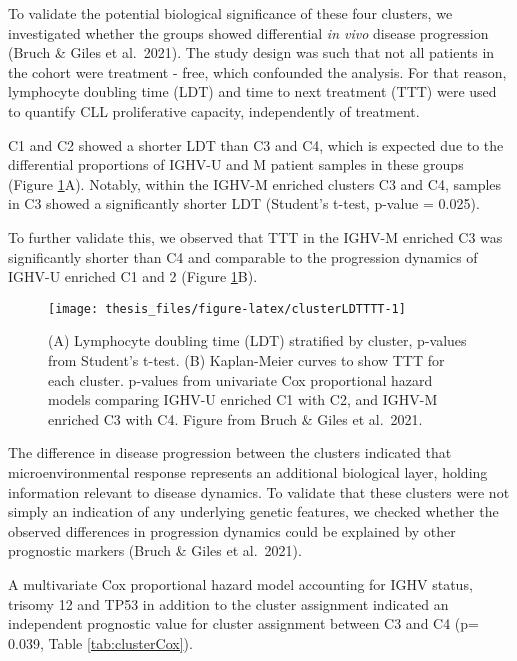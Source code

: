 \documentclass[11pt, a4paper, twosided]{book}
\begin{document}
To validate the potential biological significance of these four clusters, we investigated whether the groups showed differential \emph{in vivo} disease progression (Bruch \& Giles et al.~2021). The study design was such that not all patients in the cohort were treatment - free, which confounded the analysis. For that reason, lymphocyte doubling time (LDT) and time to next treatment (TTT) were used to quantify CLL proliferative capacity, independently of treatment.

C1 and C2 showed a shorter LDT than C3 and C4, which is expected due to the differential proportions of IGHV-U and M patient samples in these groups (Figure \ref{fig:clusterLDTTTT}A). Notably, within the IGHV-M enriched clusters C3 and C4, samples in C3 showed a significantly shorter LDT (Student's t-test, p-value = 0.025).

To further validate this, we observed that TTT in the IGHV-M enriched C3 was significantly shorter than C4 and comparable to the progression dynamics of IGHV-U enriched C1 and 2 (Figure \ref{fig:clusterLDTTTT}B).


\begin{figure}

{\centering \texttt{[image: thesis\_files/figure-latex/clusterLDTTTT-1]} 

}

\caption{(A) Lymphocyte doubling time (LDT) stratified by cluster, p-values from Student's t-test. (B) Kaplan-Meier curves to show TTT for each cluster. p-values from univariate Cox proportional hazard models comparing IGHV-U enriched C1 with C2, and IGHV-M enriched C3 with C4. Figure from Bruch \& Giles et al.~2021.}\label{fig:clusterLDTTTT}
\end{figure}
The difference in disease progression between the clusters indicated that microenvironmental response represents an additional biological layer, holding information relevant to disease dynamics. To validate that these clusters were not simply an indication of any underlying genetic features, we checked whether the observed differences in progression dynamics could be explained by other prognostic markers (Bruch \& Giles et al.~2021).

A multivariate Cox proportional hazard model accounting for IGHV status, trisomy 12 and TP53 in addition to the cluster assignment indicated an independent prognostic value for cluster assignment between C3 and C4 (p= 0.039, Table \ref{tab:clusterCox}).
\end{document}
